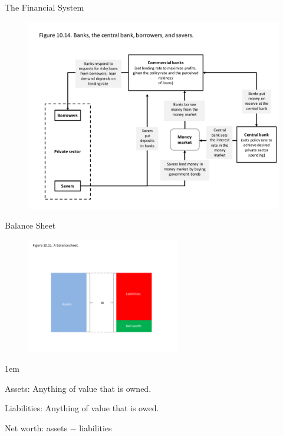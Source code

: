 \documentclass[11pt,aspectratio=43,usenames,dvipsnames]{beamer}
\let\olditemize=\itemize
\let\endolditemize=\enditemize
\renewenvironment{itemize}{\olditemize \itemsep1em}{\endolditemize}
\theoremstyle{definition}
\begin{document}
\begin{frame}{The Financial System}
\label{slide:The_Financial_System}
    \begin{figure}
        \centering
        \includegraphics[trim={1cm 1cm 0cm 2.5cm}, clip, width=\textwidth]{./figures/Figure21.pdf}
    \end{figure}

\end{frame}



\begin{frame}{Balance Sheet}
\label{slide:Balance_Sheet}
    \begin{figure}
        \centering
        \includegraphics[trim={1.5cm 1.5cm 1.5cm 1.5cm}, clip, width=0.6\textwidth]{./figures/Figure13.pdf}
    \end{figure}
    \begin{itemize}
        \item \alert{Assets}: Anything of value that is owned.
        \item \alert{Liabilities}: Anything of value that is owed.
        \item \alert{Net worth}: assets $ - $ liabilities
    \end{itemize}

\end{frame}
\end{document}
